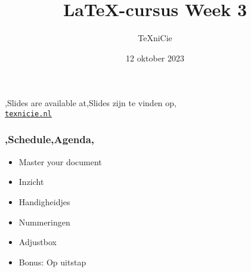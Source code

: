 \documentclass[
    dutch,
    everyoneauthor=true,
    defaultSlideCollection=vincent,
]{../../cursuspresentatie}
\title[\LaTeX{}-cursus Week 3]{\LaTeX{}-cursus Week 3}
\author{\TeX niCie}
\date{12 oktober 2023}
\begin{document}

\begin{frame}
    \titlepage
    \centering

    {\Large\lang,Slides are available at,Slides zijn te vinden op,\\
    \href{https://texnicie.nl}{\ul{\texttt{texnicie.nl}}}}
\end{frame}

\setul{1pt}{2pt}

\begin{frame}
    \frametitle{\lang,Schedule,Agenda,}
    
    \begin{itemize}[label=\textbullet]
        \item Master your document
        \item Inzicht
        \item Handigheidjes
        \item Nummeringen
        \item Adjustbox
        \item Bonus: Op uitstap
    \end{itemize}
\end{frame}
\end{document}
